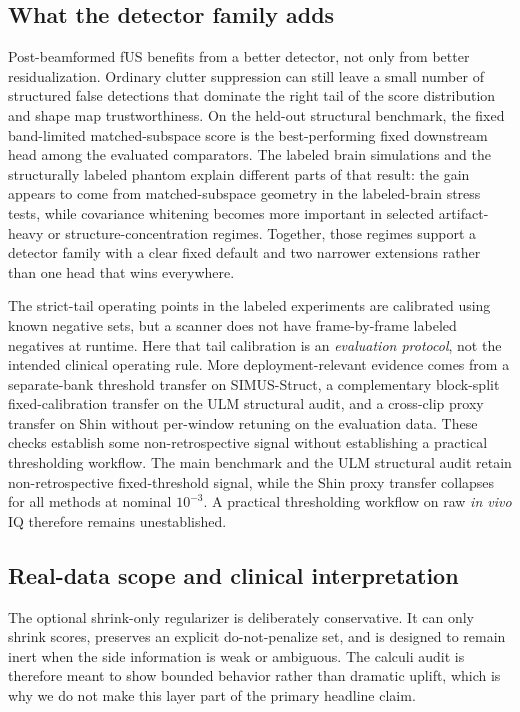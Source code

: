 \documentclass[11pt]{article}
\begin{document}
\subsection*{What the detector family adds}
Post-beamformed fUS benefits from a better detector, not only from better residualization. Ordinary clutter suppression can still leave a small number of structured false detections that dominate the right tail of the score distribution and shape map trustworthiness. On the held-out structural benchmark, the fixed band-limited matched-subspace score is the best-performing fixed downstream head among the evaluated comparators. The labeled brain simulations and the structurally labeled phantom explain different parts of that result: the gain appears to come from matched-subspace geometry in the labeled-brain stress tests, while covariance whitening becomes more important in selected artifact-heavy or structure-concentration regimes. Together, those regimes support a detector family with a clear fixed default and two narrower extensions rather than one head that wins everywhere.

The strict-tail operating points in the labeled experiments are calibrated using known negative sets, but a scanner does not have frame-by-frame labeled negatives at runtime. Here that tail calibration is an \emph{evaluation protocol}, not the intended clinical operating rule. More deployment-relevant evidence comes from a separate-bank threshold transfer on SIMUS-Struct, a complementary block-split fixed-calibration transfer on the ULM structural audit, and a cross-clip proxy transfer on Shin without per-window retuning on the evaluation data. These checks establish some non-retrospective signal without establishing a practical thresholding workflow. The main benchmark and the ULM structural audit retain non-retrospective fixed-threshold signal, while the Shin proxy transfer collapses for all methods at nominal $10^{-3}$. A practical thresholding workflow on raw \emph{in vivo} IQ therefore remains unestablished.

\subsection*{Real-data scope and clinical interpretation}
The optional shrink-only regularizer is deliberately conservative. It can only shrink scores, preserves an explicit do-not-penalize set, and is designed to remain inert when the side information is weak or ambiguous. The calculi audit is therefore meant to show bounded behavior rather than dramatic uplift, which is why we do not make this layer part of the primary headline claim.
\end{document}
